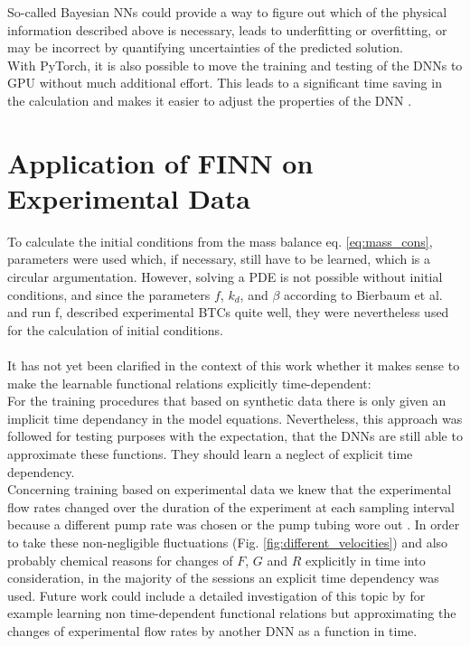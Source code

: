 So-called Bayesian NNs  \cite{Jospin2022Apr} could provide a way to figure out which of the physical information described above is necessary, leads to underfitting or overfitting, or may be incorrect by quantifying uncertainties of the predicted solution.\\
With PyTorch, it is also possible to move the training and testing of the DNNs to GPU without much additional effort. This leads to a significant time saving in the calculation and makes it easier to adjust the properties of the DNN \cite{Li2016Oct}.
\section{Application of FINN on Experimental Data}
To calculate the initial conditions from the mass balance eq. \ref{eq:mass_cons}, parameters were used which, if necessary, still have to be learned, which is a circular argumentation. However, solving a PDE is not possible without initial conditions, and since the parameters $f$, $k_d$, and $\beta$ according to Bierbaum et al. and run f, described experimental BTCs quite well, they were nevertheless used for the calculation of initial conditions.\\
\\
It has not yet been clarified in the context of this work whether it makes sense to make the learnable functional relations explicitly time-dependent:\\
For the training procedures that based on synthetic data there is only given an implicit time dependancy in the model equations. Nevertheless, this approach was followed for testing purposes with the expectation, that the DNNs are still able to approximate these functions. They should learn a neglect of explicit time dependency.\\
Concerning training based on experimental data we knew that the experimental flow rates changed over the duration of the experiment at each sampling interval because a different pump rate was chosen or the pump tubing wore out \cite{Bierbaum2022Mar}. In order to take these non-negligible fluctuations (Fig. \ref{fig:different_velocities}) and also probably chemical reasons for changes of $F$, $G$ and $R$ explicitly in time into consideration, in the majority of the sessions an explicit time dependency was used. Future work could include a detailed investigation of this topic by for example learning non time-dependent functional relations but approximating the changes of experimental flow rates by another DNN as a function in time.\\
